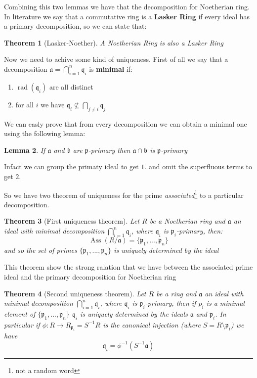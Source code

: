 \documentclass[]{article}
\theoremstyle{plain}
\newtheorem{teo}{Theorem}[section]
\newtheorem{lem}[teo]{Lemma}
\theoremstyle{remark}
\theoremstyle{definition}
\newcommand{\p}{\mathfrak{p}}
\newcommand{\q}{\mathfrak{q}}
\newcommand{\A}{\mathfrak{a}}
\newcommand{\B}{\mathfrak{b}}
\DeclareMathOperator{\rad}{rad}
\DeclareMathOperator{\Ass}{Ass}
\begin{document}
Combining this two lemmas we have that the decomposition for Noetherian ring. In literature we say that a commutative ring is a \textbf{Lasker Ring} if every ideal has a primary decomposition, so we can state that:

\begin{teo}[Lasker-Noether]
A Noetherian Ring is also a Lasker Ring
\end{teo}
Now we need to achive some kind of uniqueness. First of all we say that a decomposition $ \A = \bigcap_{i=1}^n \q_i $ is \textbf{minimal} if:
\begin{enumerate}
\item $ \rad(\q_i) $ are all distinct
\item for all $ i $ we have $ \q_i \not \subseteq \bigcap_{j\neq i} \q_j $
\end{enumerate}

We can easly prove that from every decomposition we can obtain a minimal one using the following lemma:

\begin{lem}
If $ \A $ and $ \B $ are $ \p $-primary then $ \A \cap \B $ is $ \p $-primary
\end{lem}

Infact we can group the primaty ideal to get $ 1. $ and omit the superfluous terms to get $ 2. $

So we have two theorem of uniqueness for the prime \textit{associated}\footnote{not a random word} to a particular decomposition. 

\begin{teo}[First uniqueness theorem]
Let $ R $ be a Noetherian ring and $ \A $ an ideal with minimal decomposition $ \bigcap_{i=1}^n \q_i $, where $ \q_i $ is $ \p_i $-primary, then:
\[ \Ass(R/ \A) = \{ \p_1 , ... , \p_n \} \]
and so the set of primes $ \{ \p_1 , ... , \p_n \} $ is uniquely determined by the ideal

\end{teo}

This theorem show the strong ralation that we have between the associated prime ideal and the primary decomposition for Noetherian ring

\begin{teo}[Second uniqueness theorem]
Let $ R $ be a ring and $ \A $ an ideal with minimal decomposition $ \bigcap_{i=1}^n \q_i $, where $ \q_i $ is $ \p_i $-primary, then if $ p_i $ is a minimal element of $ \{ \p_1 , ... , \p_n \} $ $ \q_i $ is uniquely determined by the ideals $ \A $ and $ \p_i $.
In particular if $ \phi : R \to R_{\p_i} = S^{-1} R$ is the canonical injection (where $ S = R \setminus \p_i $) we have
\[ 
\q_i = \phi ^{-1} ( S^{-1} \A  )
\]

\end{teo}
\end{document}
